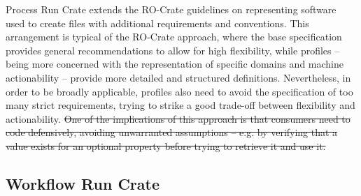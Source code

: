 \documentclass[10pt,letterpaper]{article}
\providecommand{\DIFdeltex}[1]{{\protect\color{red}\sout{#1}}}                      %
\providecommand{\DIFdelbegin}{} %
\providecommand{\DIFdelend}{} %
\providecommand{\DIFdel}[1]{\texorpdfstring{\DIFdeltex{#1}}{}} %
\newcommand{\DIFscaledelfig}{0.5}
\newlength{\DIFdelgraphicswidth} %
\newlength{\DIFdelgraphicsheight} %
\newcommand{\DIFdelincludegraphics}[2][]{%
\sbox{\DIFdelgraphicsbox}{\DIFOincludegraphics[#1]{#2}}%
\settoboxwidth{\DIFdelgraphicswidth}{\DIFdelgraphicsbox} %
\settoboxtotalheight{\DIFdelgraphicsheight}{\DIFdelgraphicsbox} %
\scalebox{\DIFscaledelfig}{%
\parbox[b]{\DIFdelgraphicswidth}{\usebox{\DIFdelgraphicsbox}\\[-\baselineskip] \rule{\DIFdelgraphicswidth}{0em}}\llap{\resizebox{\DIFdelgraphicswidth}{\DIFdelgraphicsheight}{%
\setlength{\unitlength}{\DIFdelgraphicswidth}%
\begin{picture}(1,1)%
\thicklines\linethickness{2pt} %
{\color[rgb]{1,0,0}\put(0,0){\framebox(1,1){}}}%
{\color[rgb]{1,0,0}\put(0,0){\line( 1,1){1}}}%
{\color[rgb]{1,0,0}\put(0,1){\line(1,-1){1}}}%
\end{picture}%
}\hspace*{3pt}}} %
} %
\DeclareRobustCommand{\DIFdelbegin}{\DIFOdelbegin \let\includegraphics\DIFdelincludegraphics} %
\DeclareRobustCommand{\DIFdelend}{\DIFOaddend \let\includegraphics\DIFOincludegraphics} %
\begin{document}
Process Run Crate extends the RO-Crate guidelines on representing software used to create files with additional requirements and conventions.
This arrangement is typical of the RO-Crate approach, where the base specification provides general recommendations to allow for high flexibility, while profiles -- being more concerned with the representation of specific domains and machine actionability -- provide more detailed and structured definitions.
Nevertheless, in order to be broadly applicable, profiles also need to avoid the specification of too many strict requirements, trying to strike a good trade-off between flexibility and actionability.
\DIFdelbegin \DIFdel{One of the implications of this approach is that consumers need to code defensively, avoiding unwarranted assumptions -- e.g. by verifying that a value exists for an optional property before trying to retrieve it and use it.
}\DIFdelend %


\subsection{Workflow Run Crate}\label{workflow-run-crate}
\end{document}
